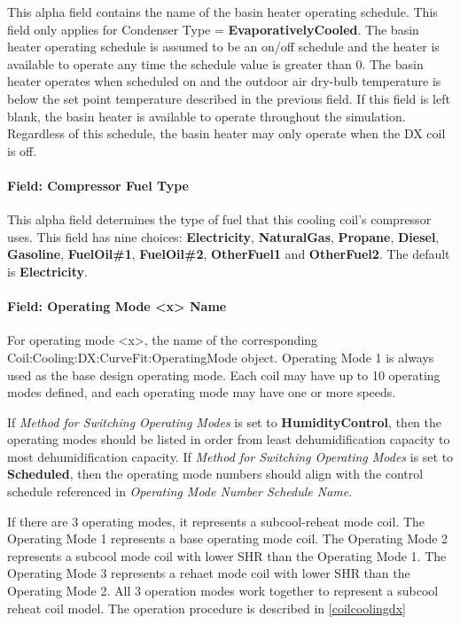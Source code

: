 This alpha field contains the name of the basin heater operating schedule. This field only applies for Condenser Type = \textbf{EvaporativelyCooled}. The basin heater operating schedule is assumed to be an on/off schedule and the heater is available to operate any time the schedule value is greater than 0. The basin heater operates when scheduled on and the outdoor air dry-bulb temperature is below the set point temperature described in the previous field. If this field is left blank, the basin heater is available to operate throughout the simulation. Regardless of this schedule, the basin heater may only operate when the DX coil is off.

\paragraph{Field: Compressor Fuel Type}\label{field-compressor-fuel-type-000}

This alpha field determines the type of fuel that this cooling coil's compressor uses. This field has nine choices: \textbf{Electricity}, \textbf{NaturalGas}, \textbf{Propane}, \textbf{Diesel}, \textbf{Gasoline}, \textbf{FuelOil\#1}, \textbf{FuelOil\#2}, \textbf{OtherFuel1} and \textbf{OtherFuel2}. The default is \textbf{Electricity}.

\paragraph{Field: Operating Mode \textless{}x\textgreater{} Name}\label{field-operating-mode-x-name}

For operating mode \textless{}x\textgreater{}, the name of the corresponding Coil:Cooling:DX:CurveFit:OperatingMode object. Operating Mode 1 is always used as the base design operating mode. Each coil may have up to 10 operating modes defined, and each operating mode may have one or more speeds.

If \textit{Method for Switching Operating Modes} is set to \textbf{HumidityControl}, then the operating modes should be listed in order from least dehumidification capacity to most dehumidification capacity. If \textit{Method for Switching Operating Modes} is set to \textbf{Scheduled}, then the operating mode numbers should align with the control schedule referenced in \textit{Operating Mode Number Schedule Name}.

If there are 3 operating modes, it represents a subcool-reheat mode coil. The Operating Mode 1 represents a base operating mode coil. The Operating Mode 2 represents a subcool mode coil with lower SHR than the Operating Mode 1. The Operating Mode 3 represents a rehaet mode coil with lower SHR than the Operating Mode 2. All 3 operation modes work together to represent a subcool reheat coil model. The operation procedure is described in \ref{coilcoolingdx}  

